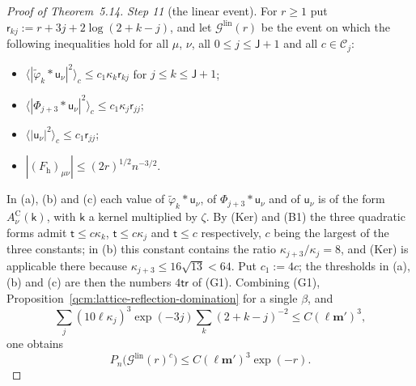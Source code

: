 \documentclass[11pt,letterpaper,reqno]{amsart}
\theoremstyle{definition}
\begin{document}
\begin{proof}[Proof of Theorem~5.14]
\emph{Step 11} (the linear event).
For $r\ge1$ put $\mathsf r_{kj}:=r+3j+2\log(2+k-j)$, and let $\mathcal G^{\mathrm{lin}}(r)$ be the event on which the following inequalities hold for all $\mu$, $\nu$, all $0\le j\le\mathsf J+1$ and all $c\in\mathcal C_j$:
\begin{itemize}
\item[(a)] $\langle|\tilde\varphi_k*\mathsf u_\nu|^2\rangle_c\le c_1\kappa_k\mathsf r_{kj}$ for $j\le k\le\mathsf J+1$;
\item[(b)] $\langle|\Phi_{j+3}*\mathsf u_\nu|^2\rangle_c\le c_1\kappa_j\mathsf r_{jj}$;
\item[(c)] $\langle|\mathsf u_\nu|^2\rangle_c\le c_1\mathsf r_{jj}$;
\item[(d)] $|(F_{\mathrm h})_{\mu\nu}|\le(2r)^{1/2}n^{-3/2}$.
\end{itemize}
In (a), (b) and (c) each value of $\tilde\varphi_k*\mathsf u_\nu$, of $\Phi_{j+3}*\mathsf u_\nu$ and of $\mathsf u_\nu$ is of the form $A^{\mathrm C}_\nu(\mathsf k)$, with $\mathsf k$ a kernel multiplied by $\zeta$.
By (Ker) and (B1) the three quadratic forms admit $\mathsf t\le c\kappa_k$, $\mathsf t\le c\kappa_j$ and $\mathsf t\le c$ respectively, $c$ being the largest of the three constants;
in (b) this constant contains the ratio $\kappa_{j+3}/\kappa_j=8$, and (Ker) is applicable there because $\kappa_{j+3}\le16\sqrt{13}<64$.
Put $c_1:=4c$;
the thresholds in (a), (b) and (c) are then the numbers $4\mathsf t\mathsf r$ of (G1).
Combining (G1), Proposition~\ref{qcm:lattice-reflection-domination} for a single $\beta$, and
\begin{equation*}
\sum_j(10\ell\kappa_j)^3\exp(-3j)\sum_k(2+k-j)^{-2}\le C(\ell\mathbf m')^3,
\end{equation*}
one obtains
\begin{equation*}
P_n\bigl(\mathcal G^{\mathrm{lin}}(r)^c\bigr)\le C(\ell\mathbf m')^3\exp(-r).
\end{equation*}


\end{proof}
\end{document}
